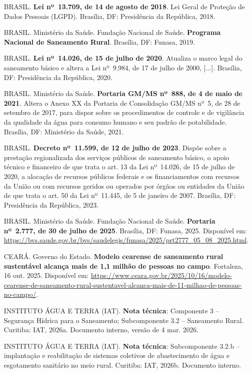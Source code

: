 \begin{SingleSpacing}
\noindent BRASIL. \textbf{Lei nº~13.709, de 14 de agosto de 2018}. Lei Geral de Proteção de Dados Pessoais (LGPD). Brasília, DF: Presidência da República, 2018.\par\medskip
\noindent BRASIL. Ministério da Saúde. Fundação Nacional de Saúde. \textbf{Programa Nacional de Saneamento Rural}. Brasília, DF: Funasa, 2019.\par\medskip
\noindent BRASIL. \textbf{Lei nº~14.026, de 15 de julho de 2020}. Atualiza o marco legal do saneamento básico e altera a Lei nº~9.984, de 17 de julho de 2000, [...]. Brasília, DF: Presidência da República, 2020.\par\medskip
\noindent BRASIL. Ministério da Saúde. \textbf{Portaria GM/MS nº~888, de 4 de maio de 2021}. Altera o Anexo XX da Portaria de Consolidação GM/MS nº~5, de 28 de setembro de 2017, para dispor sobre os procedimentos de controle e de vigilância da qualidade da água para consumo humano e seu padrão de potabilidade. Brasília, DF: Ministério da Saúde, 2021.\par\medskip
\noindent BRASIL. \textbf{Decreto nº~11.599, de 12 de julho de 2023}. Dispõe sobre a prestação regionalizada dos serviços públicos de saneamento básico, o apoio técnico e financeiro de que trata o art. 13 da Lei nº~14.026, de 15 de julho de 2020, a alocação de recursos públicos federais e os financiamentos com recursos da União ou com recursos geridos ou operados por órgãos ou entidades da União de que trata o art. 50 da Lei nº~11.445, de 5 de janeiro de 2007. Brasília, DF: Presidência da República, 2023.\par\medskip
\noindent BRASIL. Ministério da Saúde. Fundação Nacional de Saúde. \textbf{Portaria nº~2.777, de 30 de julho de 2025}. Brasília, DF: Funasa, 2025. Disponível em: \url{https://bvs.saude.gov.br/bvs/saudelegis/funasa/2025/prt2777_05_08_2025.html}.\par\medskip
\noindent CEARÁ. Governo do Estado. \textbf{Modelo cearense de saneamento rural sustentável alcança mais de 1,1 milhão de pessoas no campo}. Fortaleza, 16 out. 2025. Disponível em: \url{https://www.ceara.gov.br/2025/10/16/modelo-cearense-de-saneamento-rural-sustentavel-alcanca-mais-de-11-milhao-de-pessoas-no-campo/}.\par\medskip
\noindent INSTITUTO ÁGUA E TERRA (IAT). \textbf{Nota técnica}: Componente 3 – Segurança Hídrica para o Saneamento; Subcomponente 3.2 – Saneamento Rural. Curitiba: IAT, 2026a. Documento interno, versão de 4 mar. 2026.\par\medskip
\noindent INSTITUTO ÁGUA E TERRA (IAT). \textbf{Nota técnica}: Subcomponente 3.2.b – implantação e reabilitação de sistemas coletivos de abastecimento de água e esgotamento sanitário no meio rural. Curitiba: IAT, 2026b. Documento interno.\par\medskip

\end{SingleSpacing}

